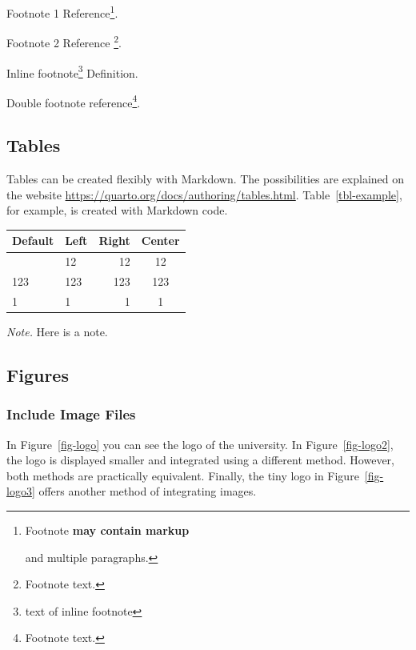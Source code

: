 \documentclass[
  stu,
  floatsintext,
  longtable,
  a4paper,
  nolmodern,
  notxfonts,
  notimes,
  colorlinks=true,linkcolor=black,citecolor=black,urlcolor=black]{apa7}
\begin{document}
Footnote 1 Reference\footnote{Footnote \textbf{may contain markup}

  and multiple paragraphs.}.

Footnote 2 Reference \footnote{Footnote text.}.

Inline footnote\footnote{text of inline footnote} Definition.

Double footnote reference\footnote{Footnote text.}.

\subsection{Tables}\label{tables}

Tables can be created flexibly with Markdown. The possibilities are
explained on the website
\url{https://quarto.org/docs/authoring/tables.html}.
Table~\ref{tbl-example}, for example, is created with Markdown code.

\begin{table}

{\caption{{An Example Table Created With
Markdown}{\label{tbl-example}}}}

\addtocounter{table}{-1}

\begin{longtable}[]{@{}llrc@{}}
\toprule\noalign{}
Default & Left & Right & Center \\
\midrule\noalign{}
\endhead
\bottomrule\noalign{}
\endlastfoot
12 & 12 & 12 & 12 \\
123 & 123 & 123 & 123 \\
1 & 1 & 1 & 1 \\
\end{longtable}

\noindent \emph{Note.} Here is a note.

\end{table}

\subsection{Figures}\label{figures}

\subsubsection{Include Image Files}\label{sec-imageload}

In Figure~\ref{fig-logo} you can see the logo of the university. In
Figure~\ref{fig-logo2}, the logo is displayed smaller and integrated
using a different method. However, both methods are practically
equivalent. Finally, the tiny logo in Figure~\ref{fig-logo3} offers
another method of integrating images.
\end{document}
